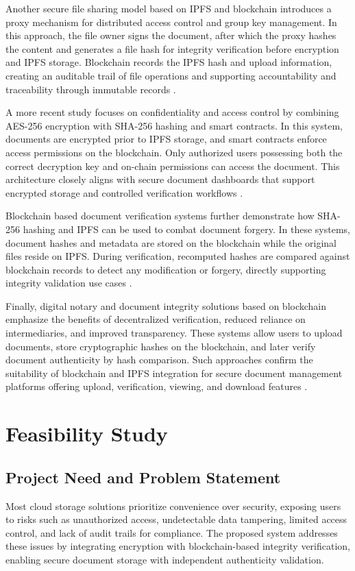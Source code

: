 \documentclass[12pt]{article}
\begin{document}
Another secure file sharing model based on IPFS and blockchain introduces a proxy mechanism for distributed access control and group key management. In this approach, the file owner signs the document, after which the proxy hashes the content and generates a file hash for integrity verification before encryption and IPFS storage. Blockchain records the IPFS hash and upload information, creating an auditable trail of file operations and supporting accountability and traceability through immutable records \cite{arxiv2205}.

A more recent study focuses on confidentiality and access control by combining AES-256 encryption with SHA-256 hashing and smart contracts. In this system, documents are encrypted prior to IPFS storage, and smart contracts enforce access permissions on the blockchain. Only authorized users possessing both the correct decryption key and on-chain permissions can access the document. This architecture closely aligns with secure document dashboards that support encrypted storage and controlled verification workflows \cite{jisem2023}.

Blockchain based document verification systems further demonstrate how SHA-256 hashing and IPFS can be used to combat document forgery. In these systems, document hashes and metadata are stored on the blockchain while the original files reside on IPFS. During verification, recomputed hashes are compared against blockchain records to detect any modification or forgery, directly supporting integrity validation use cases \cite{ijarsct2022}.

Finally, digital notary and document integrity solutions based on blockchain emphasize the benefits of decentralized verification, reduced reliance on intermediaries, and improved transparency. These systems allow users to upload documents, store cryptographic hashes on the blockchain, and later verify document authenticity by hash comparison. Such approaches confirm the suitability of blockchain and IPFS integration for secure document management platforms offering upload, verification, viewing, and download features \cite{ijraset2021}.

\newpage
\section{Feasibility Study}

\subsection{Project Need and Problem Statement}
Most cloud storage solutions prioritize convenience over security, exposing users to risks such as unauthorized access, undetectable data tampering, limited access control, and lack of audit trails for compliance. The proposed system addresses these issues by integrating encryption with blockchain-based integrity verification, enabling secure document storage with independent authenticity validation.
\end{document}
